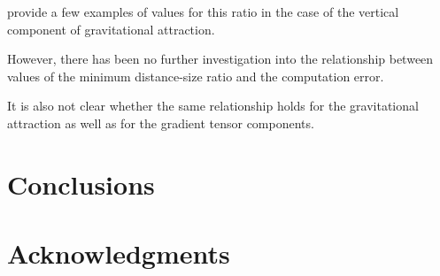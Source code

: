 \documentclass[paper,twocolumn]{geophysics}
\begin{document}
\citet{Li2011} provide a few examples of values for this ratio in the case of
the vertical component of gravitational attraction.

However, there has been no further investigation into
the relationship between values of the minimum distance-size
ratio and the computation error.

It is also not clear whether the same relationship holds for the gravitational
attraction as well as for the gradient tensor components.



\section{Conclusions}

\section{Acknowledgments}




\end{document}
